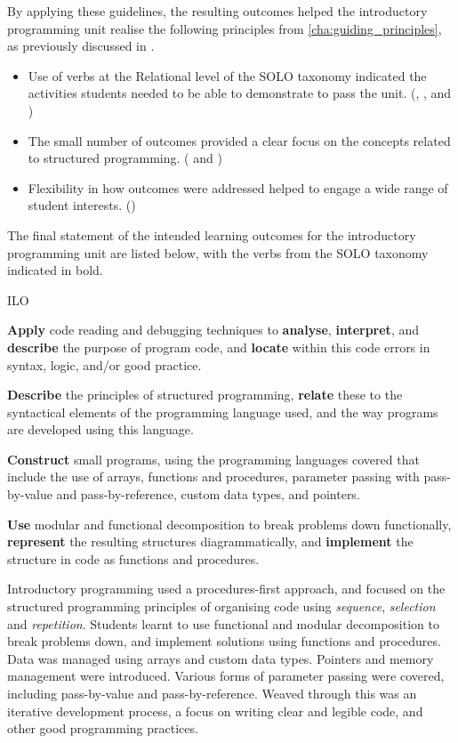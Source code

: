 By applying these guidelines, the resulting outcomes helped the introductory programming unit realise the following principles from \cref{cha:guiding_principles}, as previously discussed in .

\begin{itemize}[noitemsep,nolistsep]
	\item Use of verbs at the Relational level of the SOLO taxonomy indicated the activities students needed to be able to demonstrate to pass the unit. (, , and )
	\item The small number of outcomes provided a clear focus on the concepts related to structured programming. ( and )
	\item Flexibility in how outcomes were addressed helped to engage a wide range of student interests. ()
\end{itemize}

The final statement of the intended learning outcomes for the introductory programming unit are listed below, with the verbs from the SOLO taxonomy indicated in bold.

\begin{guidelines}{ILO}
	\item \textbf{Apply} code reading and debugging techniques to \textbf{analyse}, \textbf{interpret}, and \textbf{describe} the purpose of program code, and \textbf{locate} within this code errors in syntax, logic, and/or good practice.
	\item \textbf{Describe} the principles of structured programming, \textbf{relate} these to the syntactical elements of the programming language used, and the way programs are developed using this language.
	\item \textbf{Construct} small programs, using the programming languages covered that include the use of arrays, functions and procedures, parameter passing with pass-by-value and pass-by-reference, custom data types, and pointers.
	\item \textbf{Use} modular and functional decomposition to break problems down functionally, \textbf{represent} the resulting structures diagrammatically, and \textbf{implement} the structure in code as functions and procedures.
\end{guidelines}

Introductory programming used a procedures-first approach, and focused on the structured programming principles of organising code using \emph{sequence}, \emph{selection} and \emph{repetition}. Students learnt to use functional and modular decomposition to break problems down, and implement solutions using functions and procedures. Data was managed using arrays and custom data types. Pointers and memory management were introduced. Various forms of parameter passing were covered, including pass-by-value and pass-by-reference. Weaved through this was an iterative development process, a focus on writing clear and legible code, and other good programming practices. 

